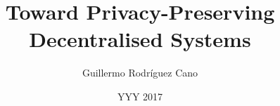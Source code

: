 

\title{Toward Privacy-Preserving Decentralised Systems}
\subtitle{}
\author{Guillermo Rodr{\'i}guez Cano}
\date{YYY 2017}
\address{
    KTH Royal Institute of Technology\\
    School of Computer Science and Communication\\
    SE-100 44 Stockholm\\
    SWEDEN}


\newcommand{\thesisauthor}{\theauthor}
\newcommand{\thesiscontactemail}{gurc@kth.se}
\newcommand{\thesissupervisor}{Sonja Buchegger and Johan Boye}
\newcommand{\thesissupervisorcover}{\thesissupervisor}
\newcommand{\thesistitle}{\thetitle}
\newcommand{\thesistitleshort}{\thesistitle}
\newcommand{\thesislanguage}{EN}
\newcommand{\thesiscopyright}{Copyright (C) 2017. Some rights reserved, \thesisauthor}
\newcommand{\thesislicense}{Creative Commons Attribution-NoDerivs 3.0 Unported (CC BY-ND 3.0)}
\newcommand{\thesislicenseurl}{https://creativecommons.org/licenses/by-nd/3.0/legalcode}
\newcommand{\thesiskeywords}{computer-based information systems, privacy}
\newcommand{\thesiskeywordsabstracten}{\thesiskeywords}
\endinput

